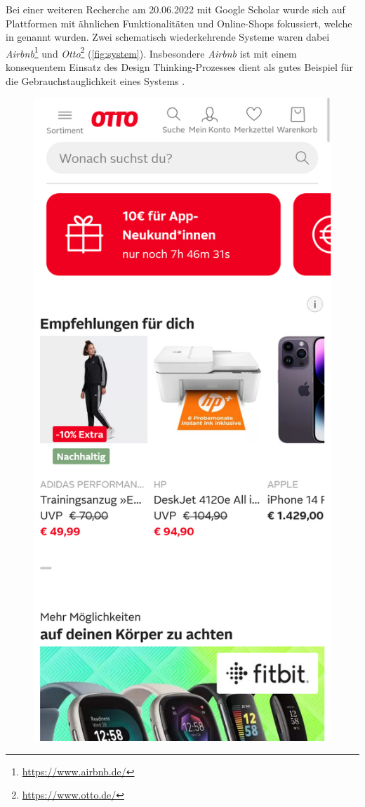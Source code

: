 Bei einer weiteren Recherche am 20.06.2022 mit Google Scholar wurde sich auf
Plattformen mit ähnlichen Funktionalitäten und Online-Shops fokussiert, welche
in  genannt wurden. Zwei schematisch
wiederkehrende Systeme waren dabei
\textit{Airbnb}\footnote{\url{https://www.airbnb.de/}} und
\textit{Otto}\footnote{\url{https://www.otto.de/}} (\ref{fig:system}).
Insbesondere \textit{Airbnb} ist mit einem konsequentem Einsatz des Design
Thinking-Prozesses dient als gutes Beispiel für die Gebrauchstauglichkeit eines
Systems \cite{glitza_hands_2019}.

\begin{figure}[h]
        \centering
        \includegraphics[scale=0.1]{Bilder/otto.png}\hspace{1em}

\end{figure}
